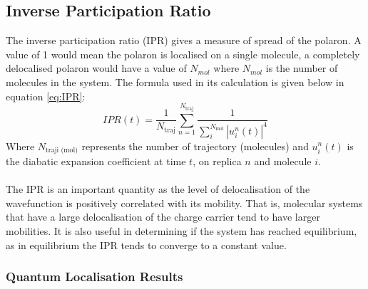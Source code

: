 \subsection{Inverse Participation Ratio}
The inverse participation ratio (IPR) gives a measure of spread of the polaron. A value of 1 would mean the polaron is localised on a single molecule, a completely delocalised polaron would have a value of $N_{mol}$ where $N_{mol}$ is the number of molecules in the system. The formula used in its calculation is given below in equation \eqref{eq:IPR}:
\begin{equation}
  IPR(t) = \frac{1}{N_{\text{traj}}} \sum_{n=1}^{N_{\text{traj}}} \frac{1}{\sum_{i}^{N_{\text{mol}}} \left| u_{i}^{n}(t) \right|^4}
  \label{eq:IPR}
\end{equation}
Where $N_{\text{traji (mol)}}$ represents the number of trajectory (molecules) and $u_{i}^{n}(t)$ is the diabatic expansion coefficient at time $t$, on replica $n$ and molecule $i$. 
\\\\
The IPR is an important quantity as the level of delocalisation of the wavefunction is positively correlated with its mobility. That is, molecular systems that have a large delocalisation of the charge carrier tend to have larger mobilities. It is also useful in determining if the system has reached equilibrium, as in equilibrium the IPR tends to converge to a constant value.
\subsubsection{Quantum Localisation Results}

